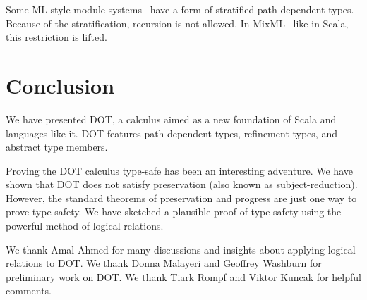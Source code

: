 \documentclass[9pt]{sigplanconf}
\begin{document}
Some ML-style module systems~\cite{homl,mixinml} have a form of
stratified path-dependent types. Because of the stratification,
recursion is not allowed. In MixML~\cite{mixml} like in Scala, this
restriction is lifted.

\section{Conclusion}\label{conclusion}

We have presented DOT, a calculus aimed as a new foundation of Scala
and languages like it. DOT features path-dependent types, refinement
types, and abstract type members.

Proving the DOT calculus type-safe has been an interesting
adventure. We have shown that DOT does not satisfy preservation (also
known as subject-reduction). However, the standard theorems of
preservation and progress are just one way to prove type safety. We
have sketched a plausible proof of type safety using the powerful
method of logical relations.

%


\acks

We thank Amal Ahmed for many discussions and insights about applying
logical relations to DOT. We thank Donna Malayeri and Geoffrey
Washburn for preliminary work on DOT. We thank Tiark Rompf and Viktor
Kuncak for helpful comments.



\end{document}
